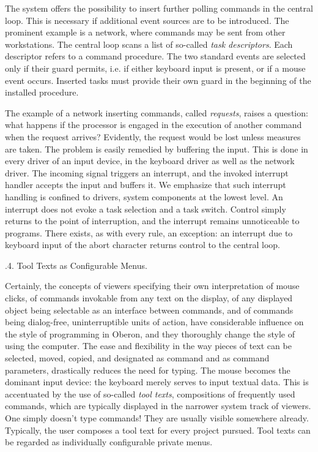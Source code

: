The system offers the possibility to insert further polling commands
in the central loop. This is necessary if additional event sources are
to be introduced. The prominent example is a network, where commands
may be sent from other workstations. The central loop scans a list of
so-called \emph{task descriptors}. Each descriptor refers to a command
procedure. The two standard events are selected only if their guard
permits, i.e. if either keyboard input is present, or if a mouse event
occurs. Inserted tasks must provide their own guard in the beginning
of the installed procedure.

The example of a network inserting commands, called \emph{requests}, raises a
question: what happens if the processor is engaged in the execution of
another command when the request arrives? Evidently, the request would
be lost unless measures are taken. The problem is easily remedied by
buffering the input. This is done in every driver of an input device,
in the keyboard driver as well as the network driver. The incoming
signal triggers an interrupt, and the invoked interrupt handler
accepts the input and buffers it. We emphasize that such interrupt
handling is confined to drivers, system components at the lowest
level. An interrupt does not evoke a task selection and a task
switch. Control simply returns to the point of interruption, and the
interrupt remains unnoticeable to programs. There exists, as with
every rule, an exception: an interrupt due to keyboard input of the
abort character returns control to the central loop.

.4. Tool Texts as Configurable Menus.

Certainly, the concepts of viewers specifying their own interpretation
of mouse clicks, of commands invokable from any text on the display,
of any displayed object being selectable as an interface between
commands, and of commands being dialog-free, uninterruptible units of
action, have considerable influence on the style of programming in
Oberon, and they thoroughly change the style of using the
computer. The ease and flexibility in the way pieces of text can be
selected, moved, copied, and designated as command and as command
parameters, drastically reduces the need for typing. The mouse becomes
the dominant input device: the keyboard merely serves to input textual
data. This is accentuated by the use of so-called \emph{tool texts},
compositions of frequently used commands, which are typically
displayed in the narrower system track of viewers. One simply doesn't
type commands! They are usually visible somewhere already. Typically,
the user composes a tool text for every project pursued. Tool texts
can be regarded as individually configurable private menus.

